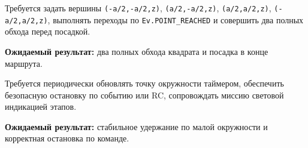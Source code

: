\begin{taskbox}
Требуется задать вершины \texttt{(-a/2,-a/2,z)}, \texttt{(a/2,-a/2,z)}, \texttt{(a/2,a/2,z)}, \texttt{(-a/2,a/2,z)}, выполнять переходы по \texttt{Ev.POINT\_REACHED} и совершить два полных обхода перед посадкой.

\textbf{Ожидаемый результат:} два полных обхода квадрата и посадка в конце маршрута.
\end{taskbox}

\begin{taskbox}[«Лоитер» по малой окружности \texttt{r=0.2}]
Требуется периодически обновлять точку окружности таймером, обеспечить безопасную остановку по событию или RC, сопровождать миссию световой индикацией этапов.

\textbf{Ожидаемый результат:} стабильное удержание по малой окружности и корректная остановка по команде.
\end{taskbox}
